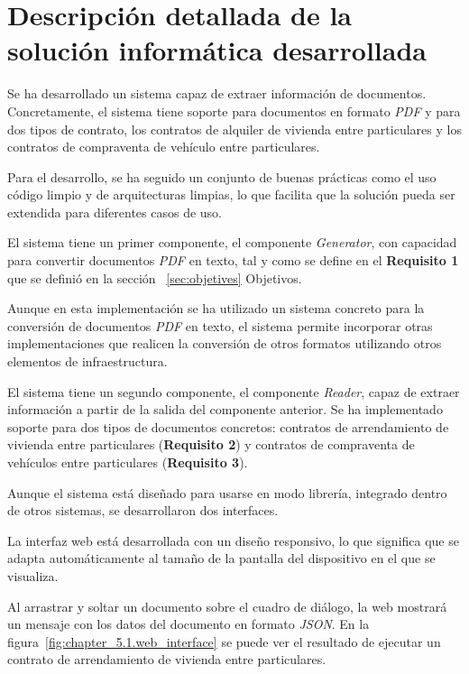 \section{Descripción detallada de la solución informática desarrollada}

Se ha desarrollado un sistema capaz de extraer información de documentos.
Concretamente, el sistema tiene soporte para documentos en formato \textit{PDF} y para dos tipos de contrato, los
contratos de alquiler de vivienda entre particulares y los contratos de compraventa de vehículo entre particulares.

Para el desarrollo, se ha seguido un conjunto de buenas prácticas como el uso código limpio y de arquitecturas limpias,
lo que facilita que la solución pueda ser extendida para diferentes casos de uso.

El sistema tiene un primer componente, el componente \textit{Generator}, con capacidad para convertir documentos
\textit{PDF} en texto, tal y como se define en el \textbf{Requisito 1} que se definió en la sección~
\ref{sec:objetives} Objetivos.

Aunque en esta implementación se ha utilizado un sistema concreto para la conversión de documentos \textit{PDF}
en texto, el sistema permite incorporar otras implementaciones que realicen la conversión de otros formatos utilizando
otros elementos de infraestructura.

El sistema tiene un segundo componente, el componente \textit{Reader}, capaz de extraer información a partir de la
salida del componente anterior.
Se ha implementado soporte para dos tipos de documentos concretos: contratos de arrendamiento de vivienda entre
particulares (\textbf{Requisito 2}) y contratos de compraventa de vehículos entre particulares (\textbf{Requisito 3}).

Aunque el sistema está diseñado para usarse en modo librería, integrado dentro de otros sistemas, se desarrollaron dos
interfaces.

La interfaz web está desarrollada con un diseño responsivo, lo que significa que se adapta automáticamente al tamaño de
la pantalla del dispositivo en el que se visualiza.

Al arrastrar y soltar un documento sobre el cuadro de diálogo, la web mostrará un mensaje con los datos del documento en
formato \textit{JSON}.
En la figura~\ref{fig:chapter_5.1.web_interface} se puede ver el resultado de ejecutar un contrato de arrendamiento
de vivienda entre particulares.

